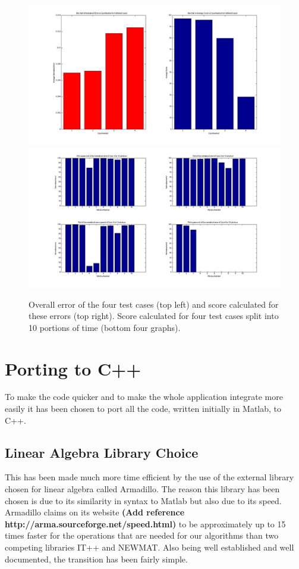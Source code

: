 \documentclass[10pt,a4paper]{article}
\begin{document}
\begin{figure}[H]
\centering
\includegraphics[scale=0.15]{Data_Analysis_Average_Score.jpg}
\includegraphics[scale=0.15]{Data_Analysis_Window_Score.jpg}

\caption{Overall error of the four test cases (top left) and score calculated for these errors (top right). Score calculated for four test cases split into 10 portions of time (bottom four graphs).}
\label{error_score}
\end{figure}

\clearpage
\section{Porting to C++}
\noindent
To make the code quicker and to make the whole application integrate more easily it has been chosen to port all the code, written initially in Matlab, to C++. 
\subsection{Linear Algebra Library Choice}
This has been made much more time efficient by the use of the external library chosen for linear algebra called Armadillo.  The reason this library has been chosen is due to its similarity in syntax to Matlab but also due to its speed. Armadillo claims on its website \textbf{(Add reference http://arma.sourceforge.net/speed.html)} to be approximately up to 15 times faster for the operations that are needed for our algorithms than two competing libraries IT++ and NEWMAT. Also being well established and well documented, the transition has been fairly simple.  
\end{document}
